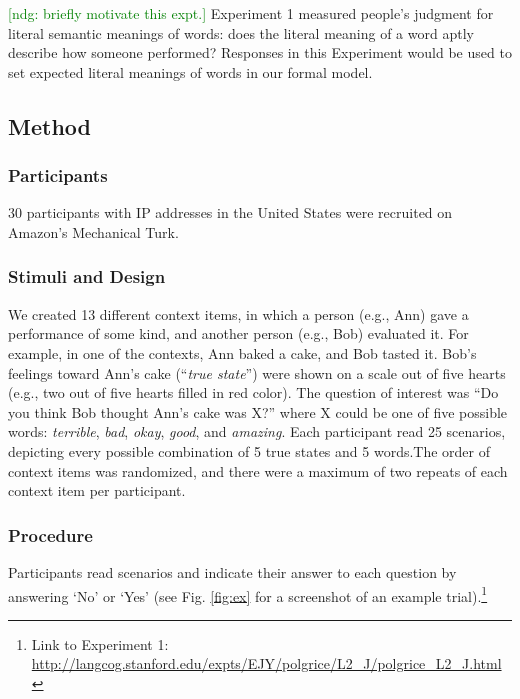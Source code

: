 \documentclass[10pt,letterpaper]{article}
\newcommand{\ndg}[1]{\textcolor{Green}{[ndg: #1]}}
\begin{document}
\ndg{briefly motivate this expt.}
Experiment 1 measured people's judgment for literal semantic meanings of words: 
does the literal meaning of a word aptly describe how someone performed?
Responses in this Experiment would be used to set expected literal meanings of words in our formal model.

\subsection{Method}

\subsubsection{Participants}

30 participants with IP addresses in the United States were recruited on Amazon's Mechanical Turk. 

\subsubsection{Stimuli and Design}

We created 13 different context items, in which a person (e.g., Ann) gave a performance of some kind, and another person (e.g., Bob) evaluated it. For example, in one of the contexts, Ann baked a cake, and Bob tasted it. Bob's feelings toward Ann's cake (``\emph{true state}'') were shown on a scale out of five hearts (e.g., two out of five hearts filled in red color). The question of interest was ``Do you think Bob thought Ann's cake was X?'' where X could be one of five possible words: \emph{terrible}, \emph{bad}, \emph{okay}, \emph{good}, and \emph{amazing}. Each participant read 25 scenarios, depicting every possible combination of 5 true states and 5 words.The order of context items was randomized, and there were a maximum of two repeats of each context item per participant.

\subsubsection{Procedure}

Participants read scenarios and indicate their answer to each question by answering `No' or `Yes' (see Fig. \ref{fig:ex} for a screenshot of an example trial).\footnote{Link to Experiment 1: \url{http://langcog.stanford.edu/expts/EJY/polgrice/L2_J/polgrice_L2_J.html}} 
\end{document}
